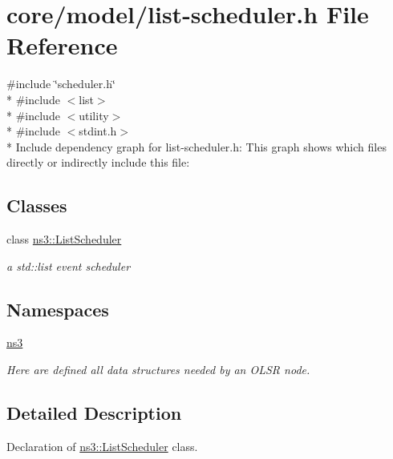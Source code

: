 \hypertarget{list-scheduler_8h}{}\section{core/model/list-\/scheduler.h File Reference}
\label{list-scheduler_8h}
{\ttfamily \#include \char`\"{}scheduler.\+h\char`\"{}}\\*
{\ttfamily \#include $<$list$>$}\\*
{\ttfamily \#include $<$utility$>$}\\*
{\ttfamily \#include $<$stdint.\+h$>$}\\*
Include dependency graph for list-\/scheduler.h\+:
This graph shows which files directly or indirectly include this file\+:
\subsection*{Classes}
\begin{DoxyCompactItemize}
\item 
class \hyperlink{classns3_1_1ListScheduler}{ns3\+::\+List\+Scheduler}
\begin{DoxyCompactList}\small\item\em a std\+::list event scheduler \end{DoxyCompactList}\end{DoxyCompactItemize}
\subsection*{Namespaces}
\begin{DoxyCompactItemize}
\item 
 \hyperlink{namespacens3}{ns3}
\begin{DoxyCompactList}\small\item\em Here are defined all data structures needed by an O\+L\+SR node. \end{DoxyCompactList}\end{DoxyCompactItemize}


\subsection{Detailed Description}
Declaration of \hyperlink{classns3_1_1ListScheduler}{ns3\+::\+List\+Scheduler} class. 